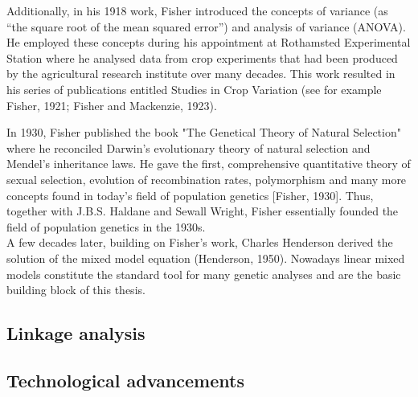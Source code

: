 Additionally, in his 1918 work, Fisher introduced the concepts of variance (as “the square root of the mean squared error”) and analysis of variance (ANOVA). 
He employed these concepts during his appointment at Rothamsted Experimental Station where he analysed data from crop experiments that had been produced by the agricultural research institute over many decades.
This work resulted in his series of publications entitled Studies in Crop Variation (see for example Fisher, 1921; Fisher and Mackenzie, 1923). 

In 1930, Fisher published the book "The Genetical Theory of Natural Selection" where he reconciled Darwin’s evolutionary theory of natural selection and Mendel’s inheritance laws. 
He gave the first, comprehensive quantitative theory of sexual selection, evolution of recombination rates, polymorphism and many more concepts found in today’s field of population genetics [Fisher, 1930]. 
Thus, together with J.B.S. Haldane and Sewall Wright, Fisher essentially founded the field of population genetics in the 1930s.\\

A few decades later, building on Fisher’s work, Charles Henderson derived the solution of the mixed model equation (Henderson, 1950). 
Nowadays linear mixed models constitute the standard tool for many genetic analyses and are the basic building block of this thesis.

\subsection{Linkage analysis}

\subsection{Technological advancements}

